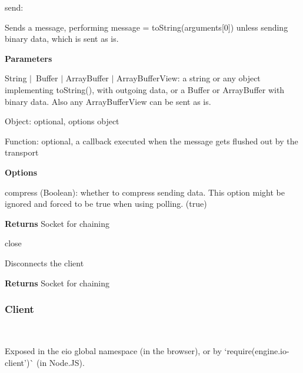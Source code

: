 \begin{DoxyItemize}
\item {\ttfamily send}\+:
\begin{DoxyItemize}
\item Sends a message, performing {\ttfamily message = to\+String(arguments\mbox{[}0\mbox{]})} unless sending binary data, which is sent as is.
\item {\bfseries Parameters}
\begin{DoxyItemize}
\item {\ttfamily String} $\vert$ {\ttfamily Buffer} $\vert$ {\ttfamily Array\+Buffer} $\vert$ {\ttfamily Array\+Buffer\+View}\+: a string or any object implementing {\ttfamily to\+String()}, with outgoing data, or a Buffer or Array\+Buffer with binary data. Also any Array\+Buffer\+View can be sent as is.
\item {\ttfamily Object}\+: optional, options object
\item {\ttfamily Function}\+: optional, a callback executed when the message gets flushed out by the transport
\end{DoxyItemize}
\item {\bfseries Options}
\begin{DoxyItemize}
\item {\ttfamily compress} ({\ttfamily Boolean})\+: whether to compress sending data. This option might be ignored and forced to be {\ttfamily true} when using polling. ({\ttfamily true})
\end{DoxyItemize}
\item {\bfseries Returns} {\ttfamily Socket} for chaining
\end{DoxyItemize}
\item {\ttfamily close}
\begin{DoxyItemize}
\item Disconnects the client
\item {\bfseries Returns} {\ttfamily Socket} for chaining
\end{DoxyItemize}
\end{DoxyItemize}

\subsubsection*{Client}



~\newline


Exposed in the {\ttfamily eio} global namespace (in the browser), or by `require(\textquotesingle{}engine.\+io-\/client')\`{} (in Node.\+JS).


